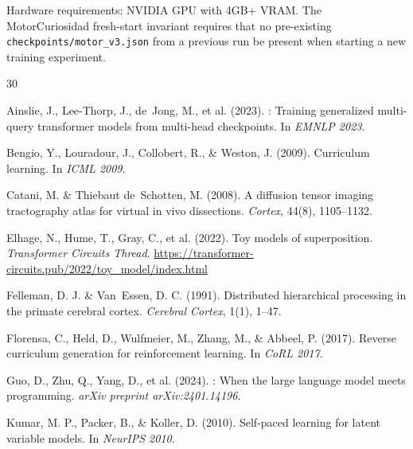 \documentclass[11pt,a4paper]{article}
\begin{document}
Hardware requirements: NVIDIA GPU with 4GB+ VRAM.  The MotorCuriosidad
fresh-start invariant requires that no pre-existing
\texttt{checkpoints/motor\_v3.json} from a previous run be present when
starting a new training experiment.


\begin{thebibliography}{30}

Ainslie, J., Lee-Thorp, J., de~Jong, M., et al. (2023).
: Training generalized multi-query transformer models from
multi-head checkpoints.
\newblock In \emph{EMNLP 2023}.

Bengio, Y., Louradour, J., Collobert, R., \& Weston, J. (2009).
\newblock Curriculum learning.
\newblock In \emph{ICML 2009}.

Catani, M. \& Thiebaut de~Schotten, M. (2008).
\newblock A diffusion tensor imaging tractography atlas for virtual in vivo
dissections.
\newblock \emph{Cortex}, 44(8), 1105--1132.

Elhage, N., Hume, T., Gray, C., et al. (2022).
\newblock Toy models of superposition.
\newblock \emph{Transformer Circuits Thread}.
\newblock \url{https://transformer-circuits.pub/2022/toy\_model/index.html}

Felleman, D. J. \& Van~Essen, D. C. (1991).
\newblock Distributed hierarchical processing in the primate cerebral cortex.
\newblock \emph{Cerebral Cortex}, 1(1), 1--47.

Florensa, C., Held, D., Wulfmeier, M., Zhang, M., \& Abbeel, P. (2017).
\newblock Reverse curriculum generation for reinforcement learning.
\newblock In \emph{CoRL 2017}.

Guo, D., Zhu, Q., Yang, D., et al. (2024).
: When the large language model meets programming.
\newblock \emph{arXiv preprint arXiv:2401.14196}.

Kumar, M. P., Packer, B., \& Koller, D. (2010).
\newblock Self-paced learning for latent variable models.
\newblock In \emph{NeurIPS 2010}.


\end{thebibliography}
\end{document}
